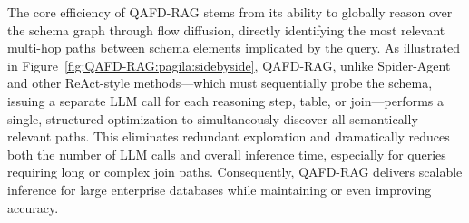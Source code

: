 \documentclass{article} %
\begin{document}
The core efficiency of QAFD-RAG stems from its ability to globally reason over the schema graph through flow diffusion, directly identifying the most relevant multi-hop paths between schema elements implicated by the query. As illustrated in Figure~\ref{fig:QAFD-RAG:pagila:sidebyside}, QAFD-RAG, unlike Spider-Agent and other ReAct-style methods—which must sequentially probe the schema, issuing a separate LLM call for each reasoning step, table, or join—performs a single, structured optimization to simultaneously discover all semantically relevant paths. This eliminates redundant exploration and dramatically reduces both the number of LLM calls and overall inference time, especially for queries requiring long or complex join paths. Consequently, QAFD-RAG delivers scalable inference for large enterprise databases while maintaining or even improving accuracy.  



\end{document}
